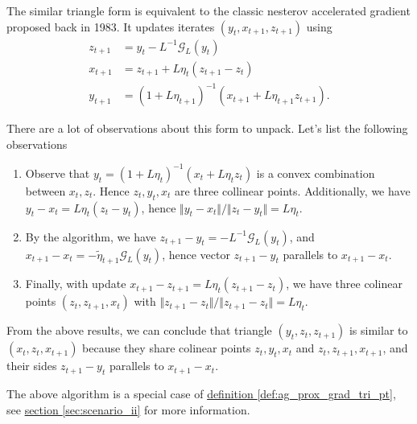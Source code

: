 \documentclass[12pt]{article}
\begin{document}
            \begin{definition}
            \label{def:ag_form_similar_tria_I}
                The similar triangle form is equivalent to the classic nesterov accelerated gradient proposed back in 1983. 
                It updates iterates $(y_t, x_{t + 1}, z_{t + 1})$ using 
                \begin{align*}
                    z_{t + 1} &= y_t - L^{-1} \mathcal G_L(y_t) 
                    \\
                    x_{t + 1} &= z_{t + 1} + L\eta_t (z_{t + 1} - z_t)
                    \\
                    y_{t + 1} &= 
                    (1 + L\eta_{t + 1})^{-1}
                    (x_{t + 1} + L\eta_{t + 1}z_{t + 1}). 
                \end{align*}
            \end{definition}
            \begin{observation}
                There are a lot of observations about this form to unpack. 
                Let's list the following observations
                \begin{enumerate}
                    \item Observe that $y_t = (1 + L\eta_t)^{-1}(x_t + L\eta_t z_t)$ is a convex combination between $x_t, z_t$. Hence $z_t, y_t, x_t$ are three collinear points. Additionally, we have $y_t - x_t = L\eta_t (z_t - y_t)$, hence $\Vert y_t - x_t\Vert/\Vert z_t - y_t\Vert = L\eta_t$. 
                    \item By the algorithm, we have $z_{t + 1} - y_t = - L^{-1} \mathcal G_L(y_t)$, and $x_{t + 1} - x_t = - \tilde \eta_{t + 1} \mathcal G_L(y_t)$, hence vector $z_{t + 1} - y_t$ parallels to $x_{t + 1} - x_t$. 
                    \item Finally, with update $x_{t +1} - z_{t + 1} = L\eta_t (z_{t +1} - z_t)$, we have three colinear points $(z_t, z_{t + 1}, x_t)$ with $\Vert z_{t + 1} - z_t\Vert/\Vert z_{t +1 } - z_t\Vert = L\eta_t$. 
                \end{enumerate}
                From the above results, we can conclude that triangle $(y_t, z_t, z_{t + 1})$ is similar to $(x_t, z_t, x_{t + 1})$ because they share colinear points $z_t, y_t, x_t$ and $z_t, z_{t + 1}, x_{t + 1}$, and their sides $z_{t + 1} - y_t$ parallels to $x_{t + 1} - x_t$. 
            \end{observation}
            \begin{remark}
                The above algorithm is a special case of 
                \hyperref[def:ag_prox_grad_tri_pt]{definition \ref*{def:ag_prox_grad_tri_pt}}, 
                see 
                \hyperref[sec:scenario_ii]{section \ref*{sec:scenario_ii}} for more information. 
            \end{remark}
\end{document}
